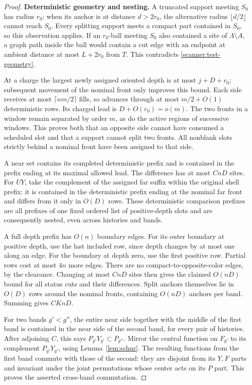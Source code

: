 \begin{proof}
\textbf{Deterministic geometry and nesting.}
A truncated support meeting \(S_0\) has radius \(r_0\): when its
anchor is at distance \(d>2r_0\), the alternative radius
\(\lfloor d/2\rfloor\) cannot reach \(S_0\).  Every splitting
support meets a compact part contained in \(S_0\), so this observation
applies.  If an \(r_0\)-ball meeting \(S_0\) also contained a site of
\(\Lambda\setminus A\), a graph path inside the ball would contain
a cut edge with an endpoint at ambient distance at most \(L+2r_0\)
from \(T\).  This contradicts \eqref{scanner:test-geometry}.

At a charge the largest newly assigned oriented depth is at most
\(j+D+r_0\); subsequent movement of the nominal front only improves
this bound.  Each side receives at most \(\lceil nm/2\rceil\) fills,
so advances through at most \(m/2+O(1)\) deterministic rows.  Its
charged lead is \(D+O(r_0)=o(m)\).  The two fronts in a window remain
separated by order \(m\), as do the active regions of successive
windows.  This proves both that an opposite side cannot have consumed
a scheduled slot and that a support cannot split two fronts.  All nonblank slots
strictly behind a nominal front have been assigned to that side.

A near set contains its completed deterministic prefix and is contained
in the prefix ending at its maximal allowed lead.  The difference has
at most \(CnD\) sites.  For \(UY\), take the complement of the
assigned far suffix within the original shell prefix: it is contained
in the deterministic prefix ending at the nominal far front and differs
from it only in \(O(D)\) rows.  These deterministic comparison prefixes
are all prefixes of one fixed ordered list of positive-depth slots and
are consequently nested, even across histories and bands.

A full depth prefix has \(O(n)\) boundary edges.  For its outer
boundary at positive depth, use the last included row, since depth
changes by at most one along an edge.  For the boundary at depth zero,
use the first positive row.  Partial rows cost at most \(4n\) more
edges.  There are no compact-to-opposite-color edges, by the clearance.
Changing at most \(CnD\) sites then gives the claimed \(O(nD)\)
bound for all status cuts and their differences.  Split anchors themselves
lie in \(O(D)\) rows around the nominal fronts, containing \(O(nD)\)
anchors per band.  Summing gives \(CKnD\).

For two bands \(g'<g''\), the entire near side together with the middle
of the first band is contained in the near side of the second band,
for every pair of histories.  After adjoining \(C\), this says
\(P_{g'}Y_{g'}\subset P_{g''}\).  Mirror the central function on
\(F_{g'}\) to its complement \(P_{g'}Y_{g'}\), using
Lemma~\ref{lem:schur}.  The resulting functions from the first band
commute with those of the second: they are disjoint from its \(Y,F\)
parts and invariant under the joint permutations whose center acts on
its \(P\) part.  This proves the asserted cross-band commutation.


\end{proof}
